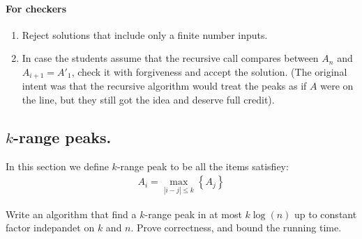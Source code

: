 \fi

\ifdefined\CHECK 
\paragraph{For checkers}
\begin{enumerate}
  \item Reject solutions that include only a finite number inputs.
  \item In case the students assume that the recursive call compares between $A_n$ and $A_{i+1} = A'_1$, check it with forgiveness and accept the solution. (The original intent was that the recursive algorithm would treat the peaks as if $A$ were on the line, but they still got the idea and deserve full credit).
\end{enumerate}
\fi




\subsection{$k$-range peaks.} In this section we define $k$-range peak to be all the items satisfiey:  
\begin{equation*}
  \begin{split}
    A_{i}= \max_{|i-j| \le k } \left\{ A_{j} \right\} 
  \end{split}
\end{equation*}

Write an algorithm that find a $k$-range peak in at most $k\log(n)$ up to constant factor indepandet on $k$ and $n$. Prove correctness, and bound the running time. 
\ifdefined\SOLUTION

